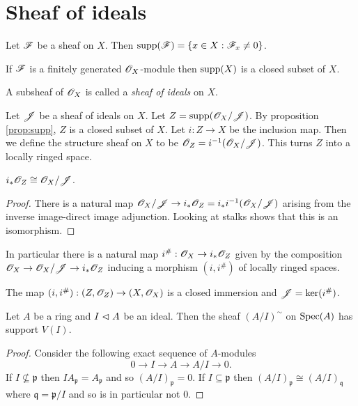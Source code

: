 \documentclass{memoir}
\begin{document}
\section{Sheaf of ideals}
\begin{definition}
    Let $\mathscr{F}$ be a sheaf on $X$.
    Then $\text{supp}(\mathscr{F}) = \{x\in X: \mathscr{F}_x \ne 0\}$.
\end{definition}
\begin{proposition}
    \label{prop:supp}
    If $\mathscr{F}$ is a finitely generated $\mathscr{O}_X$-module then $\text{supp}(X)$ is a closed subset of $X$.
\end{proposition}
\begin{definition}
    A subsheaf of $\mathscr{O}_X$ is called a \textit{sheaf of ideals} on $X$.
\end{definition}
\begin{definition}
    Let $\mathscr{J}$ be a sheaf of ideals on $X$.
    Let $Z = \text{supp}(\mathscr{O}_X/\mathscr{J})$.
    By proposition \ref{prop:supp}, $Z$ is a closed subset of $X$.
    Let $i:Z\to X$ be the inclusion map.
    Then we define the structure sheaf on $X$ to be $\mathscr{O}_Z = i^{-1}(\mathscr{O}_X/\mathscr{J})$.
    This turns $Z$ into a locally ringed space.
\end{definition}
\begin{proposition}
    $i_*\mathscr{O}_Z \cong \mathscr{O}_X/\mathscr{J}$.
\end{proposition}
\begin{proof}
    There is a natural map $\mathscr{O}_X/\mathscr{J}\to i_*\mathscr{O}_Z = i_*i^{-1}(\mathscr{O}_X/\mathscr{J})$ arising from the inverse image-direct image adjunction.
    Looking at stalks shows that this is an isomorphism.
\end{proof}
\begin{remark}
    In particular there is a natural map $i^\#:\mathscr{O}_X\to i_*\mathscr{O}_Z$ given by the composition $\mathscr{O}_X\to \mathscr{O}_X/\mathscr{J}\to i_*\mathscr{O}_Z$ inducing a morphism $(i,i^\#)$ of locally ringed spaces.
\end{remark}
\begin{corollary}
    The map $(i,i^\#):(Z,\mathscr{O}_Z)\to (X,\mathscr{O}_X)$ is a closed immersion and $\mathscr{J} = \ker(i^\#)$.
\end{corollary}
\begin{lemma}
    Let $A$ be a ring and $I\vartriangleleft A$ be an ideal.
    Then the sheaf $(A/I)^\sim$ on $\operatorname{Spec}(A)$ has support $V(I)$.
\end{lemma}
\begin{proof}
    Consider the following exact sequence of $A$-modules
    \begin{equation}
        0\to I \to A \to A/I \to 0.
    \end{equation}
    If $I\nsubseteq \mathfrak p$ then $IA_{\mathfrak p} = A_{\mathfrak p}$ and so $(A/I)_{\mathfrak p} = 0$.
    If $I\subseteq \mathfrak p$ then $(A/I)_{\mathfrak p} \cong (A/I)_{\mathfrak q}$ where $\mathfrak q = \mathfrak p/I$ and so is in particular not $0$.
\end{proof}
\end{document}
